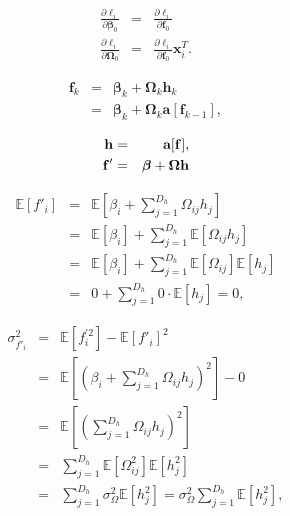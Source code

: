 \documentclass[letterpaper,twoside,openany, titlepage,oldfontcommands,titles,dvipsnames]{memoir}
\begin{document}
\begin{eqnarray}
 \frac{\partial \ell_{i}}{\partial \boldsymbol\beta_0} &=& \frac{\partial \ell_{i}}{\partial \mathbf{f}_0} \nonumber\\
 \frac{\partial \ell_{i}}{\partial \boldsymbol\Omega_0} &=& \frac{\partial \ell_{i}}{\partial \mathbf{f}_0}\mathbf{x}_{i}^{T}.
 \end{eqnarray}

\begin{eqnarray}
 \mathbf{f}_{k} &=& \boldsymbol\beta_{k} +\boldsymbol\Omega_{k}\mathbf{h}_{k}\nonumber\\
 &=& \boldsymbol\beta_{k} +\boldsymbol\Omega_{k}\textbf{a}[\mathbf{f}_{k-1}], 
 \end{eqnarray}

\begin{eqnarray}
  \mathbf{h} &=& \mbox{\bf a}[\mathbf{f}],\nonumber \\
  \mathbf{f}' &=& \boldsymbol\beta +\boldsymbol\Omega\mathbf{h} 
 \end{eqnarray}

\begin{eqnarray}
  \mathbb{E}[f'_{i}] &=& \mathbb{E}\left[\beta_{i} + \sum_{j=1}^{D_h}\Omega_{ij}h_{j}\right]\nonumber \\
  &=& \mathbb{E}\left[\beta_{i}\right] +\sum_{j=1}^{D_h}\mathbb{E}\left[\Omega_{ij}h_{j}\right] \nonumber\\
  &=& \mathbb{E}\left[\beta_{i}\right] +\sum_{j=1}^{D_h}\mathbb{E}\left[\Omega_{ij}\right]\mathbb{E}\left[h_{j}\right] \nonumber\\
  &=& 0 + \sum_{j=1}^{D_h} 0\cdot\mathbb{E}\left[h_{j}\right] = 0,
 \end{eqnarray}

\begin{eqnarray}
  \sigma^{2}_{f'_i} &=& \mathbb{E}[f_{i}^{\prime 2}]-\mathbb{E}[f'_{i}]^{2} \nonumber \\
  &=& \mathbb{E}\left[\left(\beta_{i}+\sum_{j=1}^{D_h}\Omega_{ij}h_{j}\right)^2\right]-0\nonumber\\
  &=& \mathbb{E}\left[\left(\sum_{j=1}^{D_h}\Omega_{ij}h_{j}\right)^2\right]\nonumber\\
  &=& \sum_{j=1}^{D_h}\mathbb{E}\left[\Omega_{ij}^2\right]\mathbb{E}\left[h_{j}^2\right]\nonumber \\
  &=&\sum_{j=1}^{D_h} \sigma_\Omega^2 \mathbb{E}\left[h_{j}^2\right] = \sigma_\Omega^2 \sum_{j=1}^{D_h} \mathbb{E}\left[h_{j}^2\right],
 \end{eqnarray}
\end{document}
